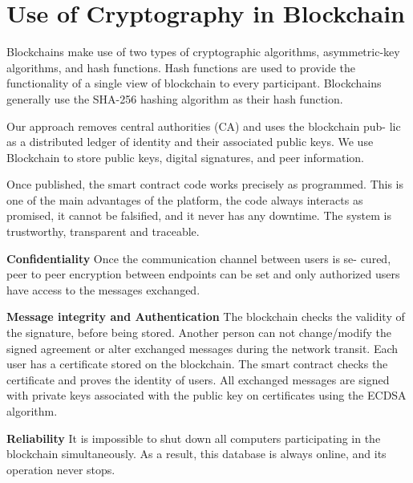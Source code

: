 \documentclass[BTech]{srmuthesis}
\begin{document}
  \section{Use of Cryptography in Blockchain}
  Blockchains make use of two types of cryptographic algorithms, asymmetric-key algorithms, and hash functions. Hash functions are used to provide the functionality of a single view of blockchain to every participant. Blockchains generally use the SHA-256 hashing algorithm as their hash function.

  Our approach removes central authorities (CA) and uses the blockchain pub- lic as a distributed ledger of identity and their associated public keys. We use Blockchain to store public keys, digital signatures, and peer information.

  Once published, the smart contract code works precisely as programmed. This is one of the main advantages of the platform, the code always interacts as promised, it cannot be falsified, and it never has any downtime. The system is trustworthy, transparent and traceable.

  \textbf{Confidentiality} Once the communication channel between users is se- cured, peer to peer encryption between endpoints can be set and only authorized users have access to the messages exchanged.
  
  \textbf{Message integrity and Authentication} The blockchain checks the validity of the signature, before being stored. Another person can not change/modify the signed agreement or alter exchanged messages during the network transit. Each user has a certificate stored on the blockchain. The smart contract checks the certificate and proves the identity of users. All exchanged messages are signed with private keys associated with the public key on certificates using the ECDSA algorithm.
  
  \textbf{Reliability} It is impossible to shut down all computers participating in the blockchain simultaneously. As a result, this database is always online, and its operation never stops.


\begin{singlespace}
\end{singlespace}
\end{document}
